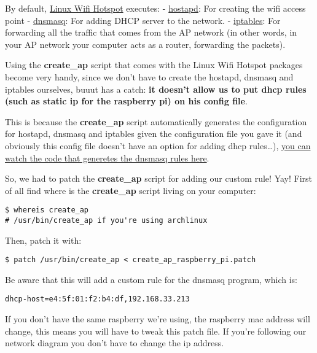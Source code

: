 By default,
\href{https://github.com/lakinduakash/linux-wifi-hotspot}{Linux Wifi
Hotspot} executes: -
\href{https://wiki.gentoo.org/wiki/Hostapd}{hostapd}: For creating the
wifi access point -
\href{https://wiki.archlinux.org/title/Dnsmasq}{dnsmasq}: For adding
DHCP server to the network. -
\href{https://wiki.archlinux.org/title/Iptables}{iptables}: For
forwarding all the traffic that comes from the AP network (in other
words, in your AP network your computer acts as a router, forwarding the
packets).

Using the \textbf{create\_ap} script that comes with the Linux Wifi
Hotspot packages become very handy, since we don't have to create the
hostapd, dnsmasq and iptables ourselves, buuut has a catch: \textbf{it
doesn't allow us to put dhcp rules (such as static ip for the raspberry
pi) on his config file}.

This is because the \textbf{create\_ap} script automatically generates
the configuration for hostapd, dnsmasq and iptables given the
configuration file you gave it (and obviously this config file doesn't
have an option for adding dhcp rules\ldots),
\href{https://github.com/lakinduakash/linux-wifi-hotspot/blob/d73242ab812284b5ed65275f630b8bc306b725c5/src/scripts/create_ap\#L1762}{you
can watch the code that generetes the dnsmasq rules here}.

So, we had to patch the \textbf{create\_ap} script for adding our custom
rule! Yay! First of all find where is the \textbf{create\_ap} script
living on your computer:

\begin{verbatim}
$ whereis create_ap
# /usr/bin/create_ap if you're using archlinux
\end{verbatim}

Then, patch it with:

\begin{verbatim}
$ patch /usr/bin/create_ap < create_ap_raspberry_pi.patch
\end{verbatim}

Be aware that this will add a custom rule for the dnsmasq program, which
is:

\begin{verbatim}
dhcp-host=e4:5f:01:f2:b4:df,192.168.33.213
\end{verbatim}

If you don't have the same raspberry we're using, the raspberry mac
address will change, this means you will have to tweak this patch file.
If you're following our network diagram you don't have to
change the ip address.

